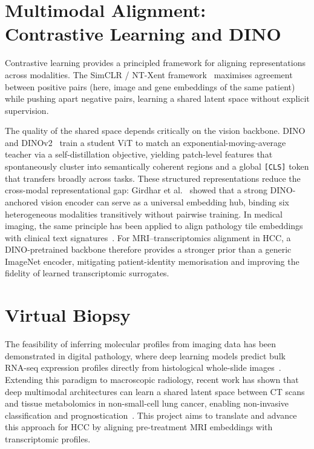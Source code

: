 \documentclass[12pt,twoside]{report}
\begin{document}
\section[Multimodal Alignment]{Multimodal Alignment: Contrastive Learning and DINO}

Contrastive learning provides a principled framework for aligning representations across modalities.
The SimCLR / NT-Xent framework~\cite{chen2020simple} maximises agreement between positive pairs
(here, image and gene embeddings of the same patient) while pushing apart negative pairs,
learning a shared latent space without explicit supervision.

The quality of the shared space depends critically on the vision backbone.
DINO~\cite{caron2021emerging} and DINOv2~\cite{oquab2024dinov2} train a student ViT to match an
exponential-moving-average teacher via a self-distillation objective, yielding patch-level features
that spontaneously cluster into semantically coherent regions and a global \texttt{[CLS]} token
that transfers broadly across tasks.
These structured representations reduce the cross-modal representational gap:
Girdhar et al.~\cite{girdhar2023imagebind} showed that a strong DINO-anchored vision encoder can
serve as a universal embedding hub, binding six heterogeneous modalities transitively without
pairwise training.
In medical imaging, the same principle has been applied to align pathology tile embeddings
with clinical text signatures~\cite{lu2024conch}.
For MRI--transcriptomics alignment in HCC, a DINO-pretrained backbone therefore provides a
stronger prior than a generic ImageNet encoder, mitigating patient-identity memorisation and
improving the fidelity of learned transcriptomic surrogates.

\section{Virtual Biopsy}

The feasibility of inferring molecular profiles from imaging data has been demonstrated
in digital pathology, where deep learning models predict bulk RNA-seq expression profiles
directly from histological whole-slide images~\cite{schmauch2020deep}.
Extending this paradigm to macroscopic radiology, recent work has shown that deep multimodal
architectures can learn a shared latent space between CT scans and tissue metabolomics in
non-small-cell lung cancer, enabling non-invasive classification and prognostication~\cite{boubnovskimartell2024deep}.
This project aims to translate and advance this approach for HCC by aligning pre-treatment MRI
embeddings with transcriptomic profiles.
\end{document}

